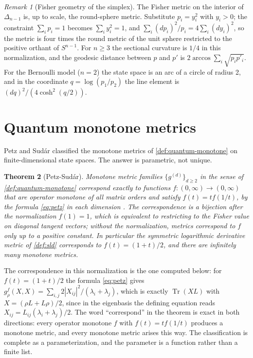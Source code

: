 \documentclass[11pt,letterpaper]{article}
\newtheorem{theorem}{Theorem}[section]
\theoremstyle{definition}
\theoremstyle{remark}
\newtheorem{remark}[theorem]{Remark}
\begin{document}
\begin{remark}[Fisher geometry of the simplex]
\label{rem:bernoulli}
The Fisher metric on the interior of $\Delta_{n-1}$ is, up to scale, the round-sphere metric. Substitute $p_i = y_i^2$ with $y_i > 0$; the constraint $\sum_i p_i = 1$ becomes $\sum_i y_i^2 = 1$, and $\sum_i (dp_i)^2 / p_i = 4 \sum_i (dy_i)^2$, so the metric is four times the round metric of the unit sphere restricted to the positive orthant of $S^{n-1}$. For $n \geq 3$ the sectional curvature is $1/4$ in this normalization, and the geodesic distance between $p$ and $p'$ is $2 \arccos \sum_i \sqrt{p_i p'_i}$. For the Bernoulli model ($n = 2$) the state space is an arc of a circle of radius 2, and in the coordinate $q = \log(p_1/p_2)$ the line element is $(dq)^2 / (4 \cosh^2(q/2))$.
\end{remark}

\section{Quantum monotone metrics}
\label{sec:quantum}

Petz and Sud\'ar \cite{petz-sudar} classified the monotone metrics of \cref{def:quantum-monotone} on finite-dimensional state spaces. The answer is parametric, not unique.

\begin{theorem}[Petz-Sud\'ar]
\label{thm:petz-sudar}
Monotone metric families $\{g^{(d)}\}_{d \geq 2}$ in the sense of \cref{def:quantum-monotone} correspond exactly to functions $f : (0, \infty) \to (0, \infty)$ that are operator monotone of all matrix orders and satisfy $f(t) = t f(1/t)$, by the formula \eqref{eq:petz} in each dimension \cite{petz-1996, petz-sudar-jmp}. The correspondence is a bijection after the normalization $f(1) = 1$, which is equivalent to restricting to the Fisher value on diagonal tangent vectors; without the normalization, metrics correspond to $f$ only up to a positive constant. In particular the symmetric logarithmic derivative metric of \cref{def:sld} corresponds to $f(t) = (1+t)/2$, and there are infinitely many monotone metrics.
\end{theorem}

The correspondence in this normalization is the one computed below: for $f(t) = (1+t)/2$ the formula \eqref{eq:petz} gives $g_{\rho}^{f}(X,X) = \sum_{i,j} 2 |X_{ij}|^2 / (\lambda_i + \lambda_j)$, which is exactly $\operatorname{Tr}(X L)$ with $X = (\rho L + L\rho)/2$, since in the eigenbasis the defining equation reads $X_{ij} = L_{ij} (\lambda_i + \lambda_j)/2$. The word ``correspond'' in the theorem is exact in both directions: every operator monotone $f$ with $f(t) = t f(1/t)$ produces a monotone metric, and every monotone metric arises this way. The classification is complete as a parameterization, and the parameter is a function rather than a finite list.
\end{document}
